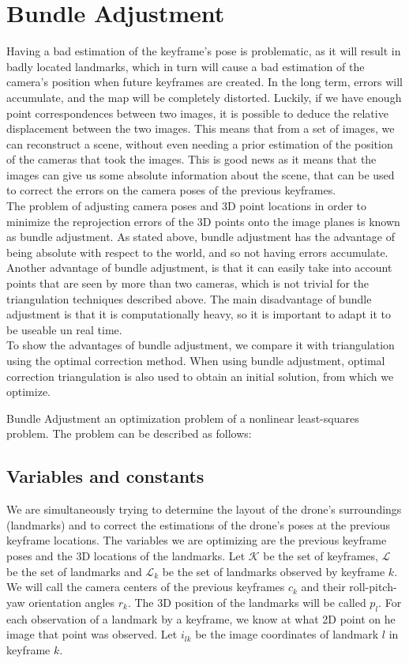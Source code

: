 \section{Bundle Adjustment}
Having a bad estimation of the keyframe's pose is problematic, as it will result in badly located landmarks, which in turn will cause a bad estimation of the camera's position when future keyframes are created. In the long term, errors will accumulate, and the map will be completely distorted. Luckily, if we have enough point correspondences between two images, it is possible to deduce the relative displacement between the two images. This means that from a set of images, we can reconstruct a scene, without even needing a prior estimation of the position of the cameras that took the images. This is good news as it means that the images can give us some absolute information about the scene, that can be used to correct the errors on the camera poses of the previous keyframes.\\
The problem of adjusting camera poses and 3D point locations in order to minimize the reprojection errors of the 3D points onto the image planes is known as bundle adjustment. As stated above, bundle adjustment has the advantage of being absolute with respect to the world, and so not having errors accumulate. Another advantage of bundle adjustment, is that it can easily take into account points that are seen by more than two cameras, which is not trivial for the triangulation techniques described above. The main disadvantage of bundle adjustment is that it is computationally heavy, so it is important to adapt it to be useable un real time.\\
To show the advantages of bundle adjustment, we compare it with triangulation using the optimal correction method. When using bundle adjustment, optimal correction triangulation is also used to obtain an initial solution, from which we optimize.

Bundle Adjustment an optimization problem of a nonlinear least-squares problem. The problem can be described as follows:

\subsection{Variables and constants}
We are simultaneously trying to determine the layout of the drone's surroundings (landmarks) and to correct the estimations of the drone's poses at the previous keyframe locations. The variables we are optimizing are the previous keyframe poses and the 3D locations of the landmarks. Let $\mathcal{K}$ be the set of keyframes, $\mathcal{L}$ be the set of landmarks and $\mathcal{L}_k$ be the set of landmarks observed by keyframe $k$. We will call the camera centers of the previous keyframes $c_k$ and their roll-pitch-yaw orientation angles $r_k$. The 3D position of the landmarks will be called $p_l$. For each observation of a landmark by a keyframe, we know at what 2D point on he image that point was observed. Let $i_{lk}$ be the image coordinates of landmark $l$ in keyframe $k$.

